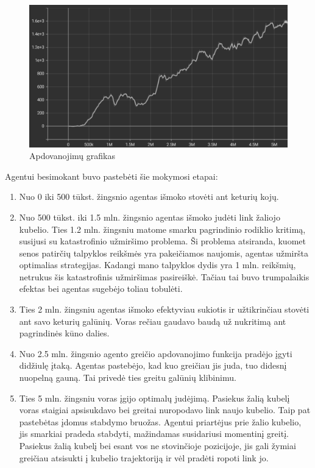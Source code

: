 \documentclass[a4paper, 12pt]{article}
\begin{document}
\begin{figure}[h]
\centering
\includegraphics[width=1\textwidth]{apdovanojimuGrafikas}
\caption{Apdovanojimų grafikas}
\label{apdovanojimuGrafikas}
\end{figure}


Agentui besimokant buvo pastebėti šie mokymosi etapai:
\begin{enumerate}
  \addtolength{\itemsep}{-0.5\baselineskip} 
  \item Nuo 0 iki 500 tūkst. žingsnio agentas išmoko stovėti ant keturių kojų.
  \item Nuo 500 tūkst. iki 1.5 mln. žingsnio agentas išmoko judėti link žaliojo kubelio. Ties 1.2 mln. žingsniu matome smarku pagrindinio rodiklio kritimą, susijusi su katastrofinio užmiršimo problema. Ši problema atsiranda, kuomet senos patirčių talpyklos reikšmės yra pakeičiamos naujomis, agentas užmiršta optimalias strategijas. Kadangi mano talpyklos dydis yra 1 mln. reikšmių, netrukus šis katastrofinis užmiršimas pasireiškė. Tačiau tai buvo trumpalaikis efektas bei agentas sugebėjo toliau tobulėti.
  \item Ties 2 mln. žingsniu agentas išmoko efektyviau sukiotis ir užtikrinčiau stovėti ant savo keturių galūnių. Voras rečiau gaudavo baudą už nukritimą ant pagrindinės kūno dalies.
  \item Nuo 2.5 mln. žingsnio agento greičio apdovanojimo funkcija pradėjo įgyti didžiulę įtaką. Agentas pastebėjo, kad kuo greičiau jis juda, tuo didesnį nuopelną gauną. Tai privedė ties greitu galūnių klibinimu.
  \item Ties 5 mln. žingsniu voras įgijo optimalų judėjimą. Pasiekus žalią kubelį voras staigiai apsisukdavo bei greitai nuropodavo link naujo kubelio. Taip pat pastebėtas įdomus stabdymo bruožas. Agentui priartėjus prie žalio kubelio, jis smarkiai pradeda stabdyti, mažindamas susidariusi momentinį greitį. Pasiekus žalią kubelį bei esant vos ne stovinčioje pozicijoje, jis gali žymiai greičiau atsisukti į kubelio trajektoriją ir vėl pradėti ropoti link jo.
\end{enumerate}
\end{document}
